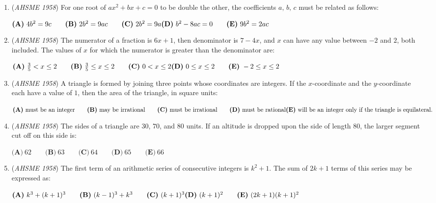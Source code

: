 \begin{enumerate}
	\item (\textit{AHSME 1958}) For one root of $ax^2 + bx + c = 0$ to be double the other, the coefficients $a,\,b,\,c$ must be related as follows:


 $\textbf{(A)}\ 4b^2 = 9c\qquad  \textbf{(B)}\ 2b^2 = 9ac\qquad  \textbf{(C)}\ 2b^2 = 9a\qquad \\ \textbf{(D)}\ b^2 - 8ac = 0\qquad  \textbf{(E)}\ 9b^2 = 2ac$


	\item (\textit{AHSME 1958}) The numerator of a fraction is $6x + 1$, then denominator is $7 - 4x$, and $x$ can have any value between $-2$ and $2$, both included. The values of $x$ for which the numerator is greater than the denominator are:


 $\textbf{(A)}\ \frac{3}{5} < x \le 2\qquad  \textbf{(B)}\ \frac{3}{5} \le x \le 2\qquad  \textbf{(C)}\ 0 < x \le 2\qquad \\ \textbf{(D)}\ 0 \le x \le 2\qquad  \textbf{(E)}\ -2 \le x \le 2$


	\item (\textit{AHSME 1958}) A triangle is formed by joining three points whose coordinates are integers. If the $x$-coordinate and the $y$-coordinate each have a value of $1$, then the area of the triangle, in square units:


 $\textbf{(A)}\ \text{must be an integer}\qquad  \textbf{(B)}\ \text{may be irrational}\qquad  \textbf{(C)}\ \text{must be irrational}\qquad  \textbf{(D)}\ \text{must be rational}\qquad \\ \textbf{(E)}\ \text{will be an integer only if the triangle is equilateral.}$


	\item (\textit{AHSME 1958}) The sides of a triangle are $30$, $70$, and $80$ units. If an altitude is dropped upon the side of length $80$, the larger segment cut off on this side is:


 $\textbf{(A)}\ 62\qquad  \textbf{(B)}\ 63\qquad  \textbf{(C)}\ 64\qquad  \textbf{(D)}\ 65\qquad  \textbf{(E)}\ 66$


	\item (\textit{AHSME 1958}) The first term of an arithmetic series of consecutive integers is $k^2 + 1$. The sum of $2k + 1$ terms of this series may be expressed as:


 $\textbf{(A)}\ k^3 + (k + 1)^3\qquad  \textbf{(B)}\ (k - 1)^3 + k^3\qquad  \textbf{(C)}\ (k + 1)^3\qquad \\ \textbf{(D)}\ (k + 1)^2\qquad  \textbf{(E)}\ (2k + 1)(k + 1)^2$



\end{enumerate}
